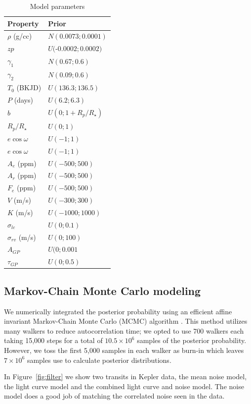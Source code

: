 \documentclass[apjl]{emulateapj}
\begin{document}
\begin{table}
\centering
\caption{Model parameters}\label{tab:priors}
\begin{tabular}{l l }
Property & Prior \\
\hline
$\rho$ (g/cc)		&	$N(0.0073;0.0001)$ \\
$zp$				& 	$U($-$0.0002;0.0002)$\\
$\gamma_1$		&	$N(0.67;0.6)$ \\
$\gamma_2$		&	$N(0.09;0.6)$\\
$T_0$ (BKJD)& $U(136.3;136.5)$\\
$P$ (days) & $U(6.2;6.3)$\\
$b$ & $U(0;1+R_{p}/R_{\star})$\\
$R_{p}/R_{\star}$ & $U(0;1)$ \\
$e\cos{\omega}$ &$U(-1;1)$ \\
$e\cos{\omega}$ & $U(-1;1)$\\
$A_e$ (ppm)&$U(-500;500)$ \\
$A_r$ (ppm)& $U(-500;500)$\\
$F_e$ (ppm)& $U(-500;500)$\\
$V$ (m/s)&$U(-300;300)$ \\
$K$ (m/s)&$U(-1000;1000)$ \\
$\sigma_{lc}$ & $U(0;0.1)$\\
$\sigma_{rv}$ (m/s)&$U(0;100)$ \\
$A_{GP}$ &  $U(0;0.001$ \\
$\tau_{GP}$ &  $U(0;0.5)$ \\
\hline
\end{tabular}
\end{table}

\subsection{Markov-Chain Monte Carlo modeling}
We numerically integrated the posterior probability using an efficient affine invariant Markov-Chain Monte Carlo (MCMC) algorithm \citep{goodman10,foreman13}.  This method utilizes many walkers to reduce autocorrelation time; we opted to use 700 walkers each taking 15,000 steps for a total of $10.5\times10^6$ samples of the posterior probability. However, we toss the first 5,000 samples in each walker as burn-in which leaves $7\times10^6$ samples use to calculate posterior distributions.

In Figure~\ref{fig:filter} we show two transits in Kepler data, the mean noise model, the light curve model and the combined light curve and noise model. The noise model does a good job of matching the correlated noise seen in the data.
\end{document}
